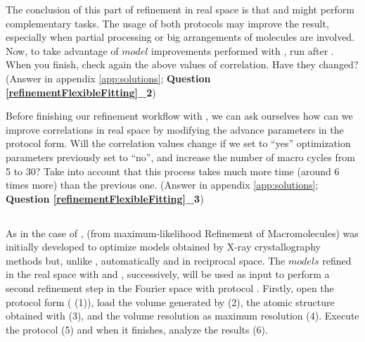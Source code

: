   The conclusion of this part of refinement in real space is that \coot and \phenix {} might perform complementary tasks. The usage of both protocols may improve the result, especially when partial processing or big arrangements of molecules are involved. Now, to take advantage of $model$ improvements performed with \coot, run \phenix {} after \coot. When you finish, check again the above values of correlation. Have they changed? (Answer in appendix \ref{app:solutions}; \textbf{Question \ref{refinementFlexibleFitting}\_2})
  
  Before finishing our refinement workflow with , we can ask ourselves how can we improve correlations in real space by modifying the advance parameters in the protocol form. Will the correlation values change if we set to ``yes'' optimization parameters previously set to ``no'', and increase the number of macro cycles from 5 to 30? Take into account that this process takes much more time (around 6 times more) than the previous one. (Answer in appendix \ref{app:solutions}; \textbf{Question \ref{refinementFlexibleFitting}\_3})\\
  
  \subsection*{  }
  
  As in the case of \coot,  (from maximum-likelihood Refinement of Macromolecules) was initially developed to optimize models obtained by X-ray crystallography methods but, unlike \coot, automatically and in reciprocal space. The $models$ refined in the real space with \coot and \phenix {}, successively, will be used as input to perform a second refinement step in the Fourier space with  protocol . Firstly, open the  protocol form ( (1)), load the volume generated by \coot (2), the atomic structure obtained with \phenix {} (3), and the volume resolution as maximum resolution (4). Execute the protocol (5) and when it finishes, analyze the results (6).
  
